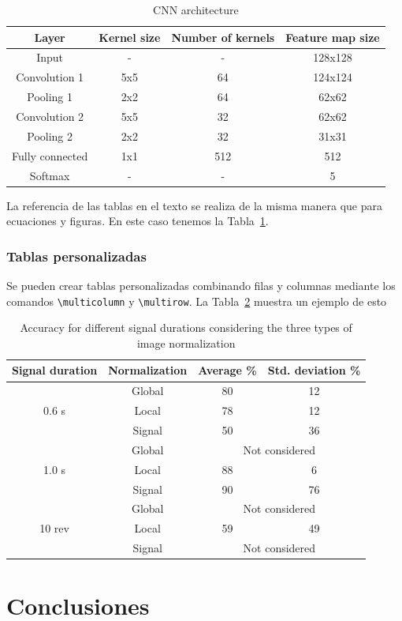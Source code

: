 \documentclass[a4paper, titletoc, 12pt]{article}
\begin{document}
\begin{table}[h]
	\centering
	\caption{CNN architecture}
	\label{tab:CNNArchitecture}
	\begin{tabular}{cccc}
		\toprule
		Layer & Kernel size & Number of kernels & Feature map size \\
		\midrule
		Input & - & - & 128x128 \\
		Convolution 1 & 5x5 & 64 & 124x124 \\
		Pooling 1 & 2x2 & 64 & 62x62 \\
		Convolution 2 & 5x5 & 32 & 62x62 \\
		Pooling 2 & 2x2 & 32 & 31x31 \\
		Fully connected & 1x1 & 512 & 512 \\
		Softmax & - & - & 5 \\
		\bottomrule
	\end{tabular}
\end{table}

La referencia de las tablas en el texto se realiza de la misma manera que para ecuaciones y figuras. En este caso tenemos la Tabla~\ref{tab:CNNArchitecture}.


\subsubsection*{Tablas personalizadas}
Se pueden crear tablas personalizadas combinando filas y columnas mediante los comandos \verb!\multicolumn! y \verb!\multirow!. La Tabla~\ref{tab:norm-type} muestra un ejemplo de esto

\begin{table}[h]
	\centering
	\caption{Accuracy for different signal durations considering the three types of image normalization}
	\label{tab:norm-type}
	\begin{tabular}{cccc}
		\toprule
		Signal duration & Normalization & Average \% & Std. deviation \% \\
		\midrule
		\multirow{3}{*}{0.6 s} & Global & 80 & 12 \\
		 & Local & 78 & 12 \\
		 & Signal & 50 & 36 \\
             \midrule
		\multirow{3}{*}{1.0 s} & Global & \multicolumn{2}{c}{Not considered} \\
		 & Local & 88 & 6 \\
		 & Signal & 90 & 76 \\
             \midrule
		\multirow{3}{*}{10 rev} & Global & \multicolumn{2}{c}{Not considered} \\
		 & Local & 59 & 49 \\
		 & Signal & \multicolumn{2}{c}{Not considered} \\
		\bottomrule
	\end{tabular}
\end{table}

\section*{Conclusiones}
\lipsum[4-5]









\end{document}
